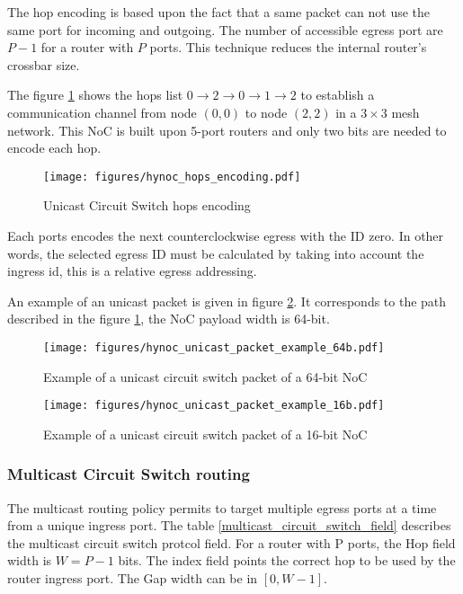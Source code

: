 The hop encoding is based upon the fact that a same packet can not use the same port for incoming and outgoing. The
number of accessible egress port are $P-1$ for a router with $P$ ports. This technique reduces the internal router's
crossbar size.

The figure \ref{hynoc_hops_encoding} shows the hops list $0 \rightarrow 2 \rightarrow 0 \rightarrow 1 \rightarrow 2$ to
establish a communication channel from node $(0, 0)$ to node $(2,2)$ in a $3 \times 3$ mesh network. This NoC is built
upon 5-port routers and only two bits are needed to encode each hop.

\begin{figure}[H]
  \centering
  \texttt{[image: figures/hynoc\_hops\_encoding.pdf]}
  \caption{Unicast Circuit Switch hops encoding}
  \label{hynoc_hops_encoding}
\end{figure}

Each ports encodes the next counterclockwise egress with the ID zero. In other words, the selected egress ID must be
calculated by taking into account the ingress id, this is a relative egress addressing.

An example of an unicast packet is given in figure \ref{hynoc_unicast_packet_example_64b}. It corresponds to the path
described in the figure \ref{hynoc_hops_encoding}, the NoC payload width is 64-bit.

\begin{figure}[H]
  \centering
  \texttt{[image: figures/hynoc\_unicast\_packet\_example\_64b.pdf]}
  \caption{Example of a unicast circuit switch packet of a 64-bit NoC}
  \label{hynoc_unicast_packet_example_64b}
\end{figure}

\begin{figure}[H]
  \centering
  \texttt{[image: figures/hynoc\_unicast\_packet\_example\_16b.pdf]}
  \caption{Example of a unicast circuit switch packet of a 16-bit NoC}
  \label{hynoc_unicast_packet_example_16b}
\end{figure}

\subsubsection{Multicast Circuit Switch routing}

The multicast routing policy permits to target multiple egress ports at a time from a unique ingress port. The table
\ref{multicast_circuit_switch_field} describes the multicast circuit switch protcol field. For a router with P ports,
the Hop field width is $W=P-1$ bits. The index field points the correct hop to be used by the router ingress port. The
Gap width can be in $[0, W-1]$.

